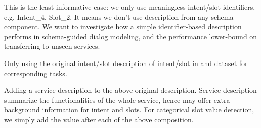  This is the least informative case: we only use
  meaningless intent/slot identifiers, e.g. Intent\_4, Slot\_2. It means we don't use
  description from any schema component. We want to investigate how a
  simple identifier-based description performs in schema-guided dialog
  modeling, and the performance lower-bound on transferring to unseen services.

 Only using the original intent/slot description
  of intent/slot in \sgdst and \multiwoz dataset for corresponding
  tasks.

 Adding a service description to the above
  original description. Service description summarize the
  functionalities of the whole service, hence may offer extra background
  information for intent and slots.
For categorical slot value detection, we simply add the
value after each of the above composition.

